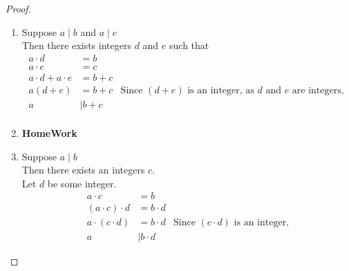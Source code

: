 \documentclass[fleqn,letterpaper,10pt,twoside]{report}
\theoremstyle{plain}
\theoremstyle{definition}
\theoremstyle{remark}
\begin{document}
\begin{proof}{\ }

   \begin{enumerate}

      \item{}

         Suppose \(a \mid b\) and \(a \mid c\) \\
         Then there exists integers \(d\) and \(e\) such that
         \begin{align*}
            a \cdot d & = b \\
            a \cdot e & = c \\
            a \cdot d + a \cdot e & = b + c \\
            a (d + e) & = b + c & \text{Since \((d + e)\) is an integer, as \(d\) and \(e\) are integers, } \\
            a & \mid b + c \\
         \end{align*}


      \item{\textbf{HomeWork}}

      \item{}

         Suppose \(a \mid b\) \\
         Then there exists an integers \(c\).\\
         Let \(d\) be some integer.
         \begin{align*}
            a \cdot c & = b \\
            (a \cdot c) \cdot d & = b \cdot d \\
            a \cdot (c \cdot d) & = b \cdot d & \text{Since \((c \cdot d)\) is an integer,} \\
            a & \mid b \cdot d
         \end{align*}


   \end{enumerate}
\end{proof}
\end{document}
